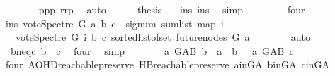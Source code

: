 \begin{isabellebody}
\ \ \ \ \ \ \isamarkupfalse%
\ ppp\ rrp\ \isamarkupfalse%
\ auto\isanewline
\ \ \ \ \isamarkupfalse%
\ {\isacharquery}{\kern0pt}thesis\ \ \isamarkupfalse%
\ ins\ ins{\isacharunderscore}{\kern0pt}{}\ \isamarkupfalse%
\ simp\isanewline
\ \ \isamarkupfalse%
\isanewline
\ \ \ \ \isamarkupfalse%
\ four\isanewline
\ \ \ \ \isamarkupfalse%
\ \isamarkupfalse%
\ ins{\isacharcolon}{\kern0pt}\ {\isachardoublequoteopen}vote{\isacharunderscore}{\kern0pt}Spectre\ G\ a\ b\ c\ {\isacharequal}{\kern0pt}\ signum\ {\isacharparenleft}{\kern0pt}sum{\isacharunderscore}{\kern0pt}list\ {\isacharparenleft}{\kern0pt}map\ {\isacharparenleft}{\kern0pt}{\isasymlambda}i{\isachardot}{\kern0pt}\isanewline
\ \ \ {\isacharparenleft}{\kern0pt}vote{\isacharunderscore}{\kern0pt}Spectre\ G\ i\ b\ c{\isacharparenright}{\kern0pt}{\isacharparenright}{\kern0pt}\ {\isacharparenleft}{\kern0pt}sorted{\isacharunderscore}{\kern0pt}list{\isacharunderscore}{\kern0pt}of{\isacharunderscore}{\kern0pt}set\ {\isacharparenleft}{\kern0pt}future{\isacharunderscore}{\kern0pt}nodes\ G\ a{\isacharparenright}{\kern0pt}{\isacharparenright}{\kern0pt}{\isacharparenright}{\kern0pt}{\isacharparenright}{\kern0pt}{\isachardoublequoteclose}\isanewline
\ \ \ \ \ \ \isamarkupfalse%
\ auto\isanewline
\ \ \ \ \isamarkupfalse%
\ \ bneqc{\isacharcolon}{\kern0pt}\ {\isachardoublequoteopen}b\ {\isasymnoteq}\ c{\isachardoublequoteclose}\ \isamarkupfalse%
\ four\ \isamarkupfalse%
\ simp\isanewline
\ \ \ \ \isamarkupfalse%
\ \isamarkupfalse%
\ {\isachardoublequoteopen}{\isasymnot}{\isacharparenleft}{\kern0pt}{\isacharparenleft}{\kern0pt}a\ {\isasymrightarrow}\isactrlsup {\isacharplus}{\kern0pt}\isactrlbsub G{\isacharunderscore}{\kern0pt}AB\isactrlesub \ b\ {\isasymor}\ a\ {\isacharequal}{\kern0pt}\ b{\isacharparenright}{\kern0pt}\ {\isasymand}\ {\isacharparenleft}{\kern0pt}{\isasymnot}\ a\ {\isasymrightarrow}\isactrlsup {\isacharplus}{\kern0pt}\isactrlbsub G{\isacharunderscore}{\kern0pt}AB\isactrlesub \ c{\isacharparenright}{\kern0pt}{\isacharparenright}{\kern0pt}{\isachardoublequoteclose}\ \isanewline
\ \ \ \ \ \ \isamarkupfalse%
\ four\ AOHD{\isachardot}{\kern0pt}reachable{}{\isacharunderscore}{\kern0pt}preserve\ HB{}{\isachardot}{\kern0pt}reachable{}{\isacharunderscore}{\kern0pt}preserve\ a{\isacharunderscore}{\kern0pt}in{\isacharunderscore}{\kern0pt}G{\isacharunderscore}{\kern0pt}A\ b{\isacharunderscore}{\kern0pt}in{\isacharunderscore}{\kern0pt}G{\isacharunderscore}{\kern0pt}A\ c{\isacharunderscore}{\kern0pt}in{\isacharunderscore}{\kern0pt}G{\isacharunderscore}{\kern0pt}A\ \isamarkupfalse%

\end{isabellebody}
